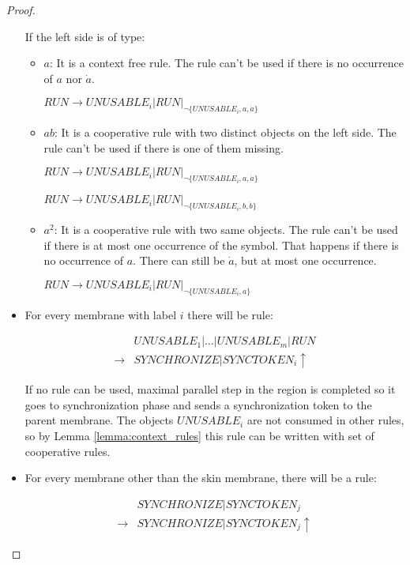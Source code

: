 \begin{proof}
\begin{itemize}
    If the left side is of type:
    \begin{itemize}
      \item $a$: It is a context free rule. The rule can't be used if there is no occurrence of $a$ nor $\dot{a}$.

      $RUN \rightarrow UNUSABLE_i|RUN|_{\neg\{UNUSABLE_i, a, \dot{a}\}}$

      \item $ab$: It is a cooperative rule with two distinct objects on the left side. The rule can't be used if there is one of them missing.

      $RUN \rightarrow UNUSABLE_i|RUN|_{\neg\{UNUSABLE_i, a, \dot{a}\}}$

      $RUN \rightarrow UNUSABLE_i|RUN|_{\neg\{UNUSABLE_i, b, \dot{b}\}}$

      \item $a^2$: It is a cooperative rule with two same objects. The rule can't be used if there is at most one occurrence of the symbol. That happens if there is no occurrence of $a$. There can still be $\dot{a}$, but at most one occurrence.

      $RUN \rightarrow UNUSABLE_i|RUN|_{\neg\{UNUSABLE_i, a\}}$
    \end{itemize}

    

    \item For every membrane with label $i$ there will be rule:

    \begin{align*}
      &UNUSABLE_1|\dots|UNUSABLE_m|RUN \\
      \rightarrow &SYNCHRONIZE|SYNCTOKEN_i\uparrow
    \end{align*}

    If no rule can be used, maximal parallel step in the region is completed so it goes to synchronization phase and sends a synchronization token to the parent membrane. The objects $UNUSABLE_i$ are not consumed in other rules, so by Lemma \ref{lemma:context_rules} this rule can be written with set of cooperative rules.

    \item For every membrane other than the skin membrane, there will be a rule:

    \begin{align*}
      &SYNCHRONIZE|SYNCTOKEN_j \\
      \rightarrow &SYNCHRONIZE|SYNCTOKEN_j\uparrow
    \end{align*}


\end{itemize}
\end{proof}
